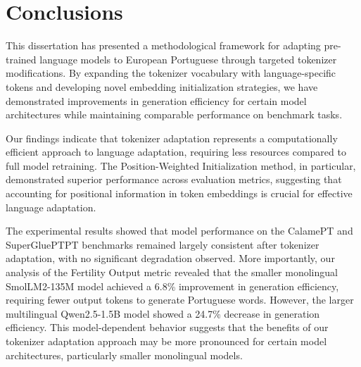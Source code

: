 
\chapter{Conclusions}


\label{chap:conclusions}
This dissertation has presented a methodological framework for adapting pre-trained language models to European Portuguese through targeted tokenizer modifications. By expanding the tokenizer vocabulary with language-specific tokens and developing novel embedding initialization strategies, we have demonstrated improvements in generation efficiency for certain model architectures while maintaining comparable performance on benchmark tasks.

Our findings indicate that tokenizer adaptation represents a computationally efficient approach to language adaptation, requiring less resources compared to full model retraining. The Position-Weighted Initialization method, in particular, demonstrated superior performance across evaluation metrics, suggesting that accounting for positional information in token embeddings is crucial for effective language adaptation.

The experimental results showed that model performance on the CalamePT and SuperGluePTPT benchmarks remained largely consistent after tokenizer adaptation, with no significant degradation observed. More importantly, our analysis of the Fertility Output metric revealed that the smaller monolingual SmolLM2-135M model achieved a 6.8\% improvement in generation efficiency, requiring fewer output tokens to generate Portuguese words. However, the larger multilingual Qwen2.5-1.5B model showed a 24.7\% decrease in generation efficiency. This model-dependent behavior suggests that the benefits of our tokenizer adaptation approach may be more pronounced for certain model architectures, particularly smaller monolingual models.


